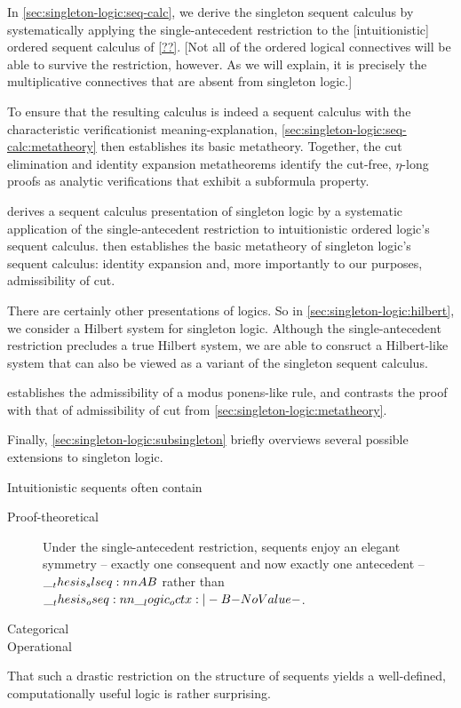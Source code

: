 In \cref{sec:singleton-logic:seq-calc}, we derive the singleton sequent calculus by systematically applying the single-antecedent restriction to the [intuitionistic] ordered sequent calculus of \cref{??}.
[Not all of the ordered logical connectives will be able to survive the restriction, however.
As we will explain, it is precisely the multiplicative connectives that are absent from singleton logic.]

To ensure that the resulting calculus is indeed a sequent calculus with the characteristic verificationist meaning-explanation, \cref{sec:singleton-logic:seq-calc:metatheory} then establishes its basic metatheory.
Together, the cut elimination and identity expansion metatheorems identify the cut-free, $\eta$-long proofs as analytic verifications that exhibit a subformula property.


 derives a sequent calculus presentation of singleton logic by a systematic application of the single-antecedent restriction to intuitionistic ordered logic's sequent calculus.
 then establishes the basic metatheory of singleton logic's sequent calculus: identity expansion and, more importantly to our purposes, admissibility of cut.

There are certainly other presentations of logics.
So in \cref{sec:singleton-logic:hilbert}, we consider a Hilbert system for singleton logic.
Although the single-antecedent restriction precludes a true Hilbert system, we are able to consruct a Hilbert-like system that can also be viewed as a variant of the singleton sequent calculus.


 establishes the admissibility of a modus ponens-like rule, and contrasts the proof with that of admissibility of cut from \cref{sec:singleton-logic:metatheory}.

Finally, \cref{sec:singleton-logic:subsingleton} briefly overviews several possible extensions to singleton logic.



Intuitionistic sequents often contain
\begin{description}
\item[Proof-theoretical]
  Under the single-antecedent restriction, sequents enjoy an elegant symmetry -- exactly one consequent and now exactly one antecedent -- $\slseq{A |- B}$ rather than $\oseq{\octx |- B}$.
\item[Categorical]
\item[Operational] 
\end{description}
That such a drastic restriction on the structure of sequents yields a well-defined, computationally useful logic is rather surprising.

